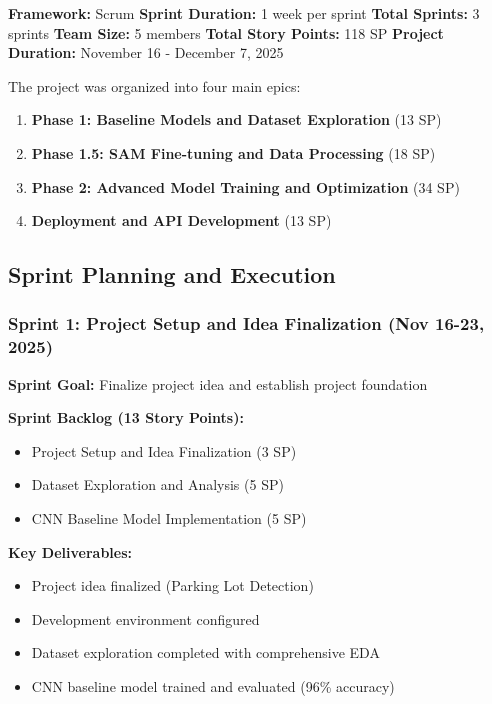 \documentclass[12pt,a4paper]{article}
\begin{document}
\textbf{Framework:} Scrum  
\textbf{Sprint Duration:} 1 week per sprint  
\textbf{Total Sprints:} 3 sprints  
\textbf{Team Size:} 5 members  
\textbf{Total Story Points:} 118 SP  
\textbf{Project Duration:} November 16 - December 7, 2025

The project was organized into four main epics:
\begin{enumerate}
    \item \textbf{Phase 1: Baseline Models and Dataset Exploration} (13 SP)
    \item \textbf{Phase 1.5: SAM Fine-tuning and Data Processing} (18 SP)
    \item \textbf{Phase 2: Advanced Model Training and Optimization} (34 SP)
    \item \textbf{Deployment and API Development} (13 SP)
\end{enumerate}

\subsection{Sprint Planning and Execution}

\subsubsection{Sprint 1: Project Setup and Idea Finalization (Nov 16-23, 2025)}

\textbf{Sprint Goal:} Finalize project idea and establish project foundation

\textbf{Sprint Backlog (13 Story Points):}
\begin{itemize}
    \item Project Setup and Idea Finalization (3 SP)
    \item Dataset Exploration and Analysis (5 SP)
    \item CNN Baseline Model Implementation (5 SP)
\end{itemize}

\textbf{Key Deliverables:}
\begin{itemize}
    \item Project idea finalized (Parking Lot Detection)
    \item Development environment configured
    \item Dataset exploration completed with comprehensive EDA
    \item CNN baseline model trained and evaluated (96\% accuracy)
\end{itemize}
\end{document}
